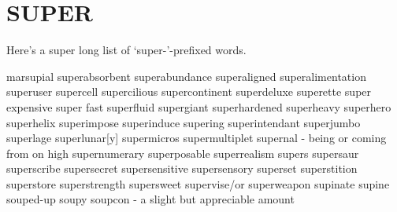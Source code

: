 \section{SUPER}
Here's a super long list of `super-'-prefixed words.

marsupial
superabsorbent
superabundance
superaligned
superalimentation
superuser
supercell
supercilious
supercontinent
superdeluxe
superette
super expensive
super fast
superfluid
supergiant
superhardened
superheavy
superhero
superhelix
superimpose
superinduce
supering
superintendant
superjumbo
superlage
superlunar[y]
supermicros
supermultiplet
supernal - being or coming from on high
supernumerary
superposable
superrealism
supers
supersaur
superscribe
supersecret
supersensitive
supersensory
superset
superstition
superstore
superstrength
supersweet
supervise/or
superweapon
supinate
supine
souped-up
soupy
soupcon - a slight but appreciable amount
